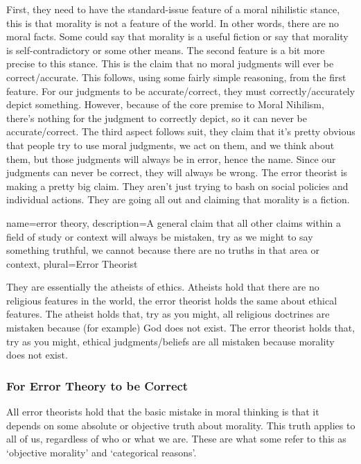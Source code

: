 First, they need to have the standard-issue feature of a moral nihilistic stance, this is that morality is not a feature of the world. In other words, there are no moral facts. Some could say that morality is a useful fiction or say that morality is self-contradictory or some other means. The second feature is a bit more precise to this stance. This is the claim that no moral judgments will ever be correct/accurate.  This follows, using some fairly simple reasoning, from the first feature. For our judgments to be accurate/correct, they must correctly/accurately depict something. However, because of the core premise to Moral Nihilism, there's nothing for the judgment to correctly depict, so it can never be accurate/correct. The third aspect follows suit, they claim that it's pretty obvious that people try to use moral judgments, we act on them, and we think about them, but those judgments will always be in error, hence the name. Since our judgments can never be correct, they will always be wrong. The error theorist is making a pretty big claim. They aren’t just trying to bash on social policies and individual actions. They are going all out and claiming that morality is a fiction.

{
  name=error theory,
  description={A general claim that all other claims within a field of study or context will always be mistaken, try as we might to say something truthful, we cannot because there are no truths in that area or context},
plural=Error Theorist
}


They are essentially the atheists of ethics. Atheists hold that there are no religious features in the world, the error theorist holds the same about ethical features. The atheist holds that, try as you might, all religious doctrines are mistaken because (for example) God does not exist. The error theorist holds that, try as you might, ethical judgments/beliefs are all mistaken because morality does not exist.

\subsubsection{For Error Theory to be Correct}

All error theorists hold that the basic mistake in moral thinking is that it depends on some absolute or objective truth about morality. This truth applies to all of us, regardless of who or what we are. These are what some refer to this as ‘objective morality’ and ‘categorical reasons’.

